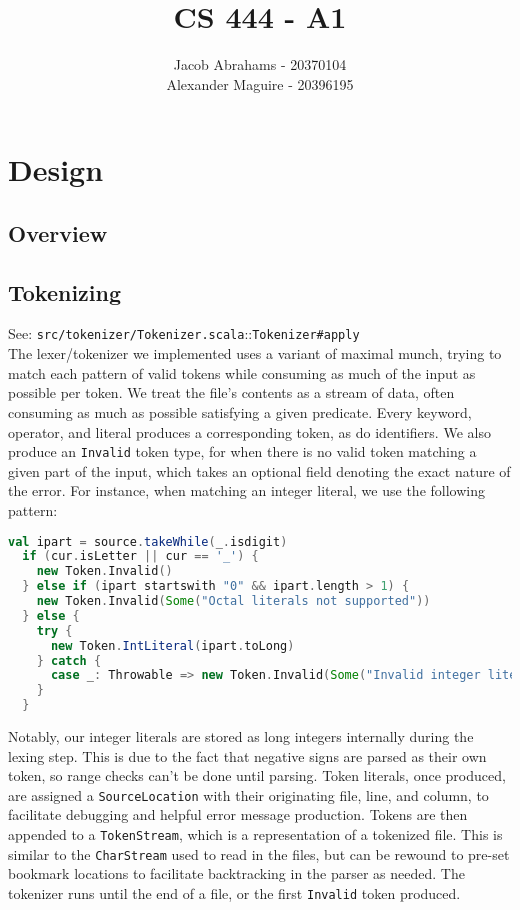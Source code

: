 \documentclass{article}
\title{CS 444 - A1}
\author{Jacob Abrahams - 20370104\\ Alexander Maguire - 20396195}
\begin{document}
\newcommand\type[1]{\texttt{#1}}
\newcommand\func[1]{\texttt{#1}}
\renewcommand\value[1]{\texttt{#1}}
\newcommand\source[2]{See: \texttt{src/#1.scala}::\type{#2} \\}
\newcommand\testsrc[1]{See: \texttt{test/#1.scala} \\}

\maketitle

\section{Design}


\subsection{Overview}


\subsection{Tokenizing}
\source{tokenizer/Tokenizer}{Tokenizer\#apply}
The lexer/tokenizer we implemented uses a variant of maximal munch, trying to match each pattern of valid tokens while consuming as much of the input as possible per token. We treat the file's contents as a stream of data, often consuming as much as possible satisfying a given predicate. Every keyword, operator, and literal produces a corresponding token, as do identifiers. We also produce an {\tt Invalid} token type, for when there is no valid token matching a given part of the input, which takes an optional field denoting the exact nature of the error. For instance, when matching an integer literal, we use the following pattern:
\begin{lstlisting}[language=Scala]
  val ipart = source.takeWhile(_.isdigit)
  if (cur.isLetter || cur == '_') {
    new Token.Invalid()
  } else if (ipart startswith "0" && ipart.length > 1) {
    new Token.Invalid(Some("Octal literals not supported"))
  } else {
    try {
      new Token.IntLiteral(ipart.toLong)
    } catch {
      case _: Throwable => new Token.Invalid(Some("Invalid integer literal "+ ipart))
    }
  }
\end{lstlisting}

Notably, our integer literals are stored as long integers internally during the lexing step. This is due to the fact that negative signs are parsed as their own token, so range checks can't be done until parsing. Token literals, once produced, are assigned a {\tt SourceLocation} with their originating file, line, and column, to facilitate debugging and helpful error message production. Tokens are then appended to a {\tt TokenStream}, which is a representation of a tokenized file. This is similar to the {\tt CharStream} used to read in the files, but can be rewound to pre-set bookmark locations to facilitate backtracking in the parser as needed. The tokenizer runs until the end of a file, or the first {\tt Invalid} token produced.
\end{document}

